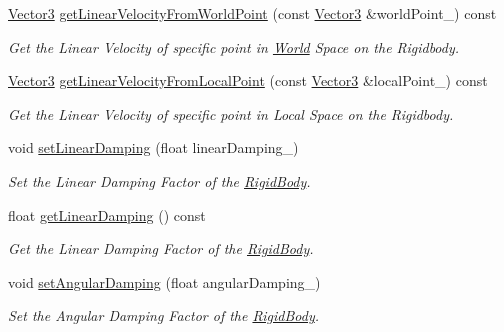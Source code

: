 \begin{DoxyCompactItemize}
\hyperlink{class_i_dream_sky_1_1_vector3}{Vector3} \hyperlink{class_i_dream_sky_1_1_physics3_1_1_rigid_body_a671f0361b94d8727d152e0dc17eaa7e6}{get\+Linear\+Velocity\+From\+World\+Point} (const \hyperlink{class_i_dream_sky_1_1_vector3}{Vector3} \&world\+Point\+\_\+) const 
\begin{DoxyCompactList}\small\item\em Get the Linear Velocity of specific point in \hyperlink{class_i_dream_sky_1_1_physics3_1_1_world}{World} Space on the Rigidbody. \end{DoxyCompactList}\item 
\hyperlink{class_i_dream_sky_1_1_vector3}{Vector3} \hyperlink{class_i_dream_sky_1_1_physics3_1_1_rigid_body_a5aca0169fb6e1fb70158cec477f53e73}{get\+Linear\+Velocity\+From\+Local\+Point} (const \hyperlink{class_i_dream_sky_1_1_vector3}{Vector3} \&local\+Point\+\_\+) const 
\begin{DoxyCompactList}\small\item\em Get the Linear Velocity of specific point in Local Space on the Rigidbody. \end{DoxyCompactList}\item 
void \hyperlink{class_i_dream_sky_1_1_physics3_1_1_rigid_body_a5fd41697e67b5dea2b5ca0bcdcda9c22}{set\+Linear\+Damping} (float linear\+Damping\+\_\+)
\begin{DoxyCompactList}\small\item\em Set the Linear Damping Factor of the \hyperlink{class_i_dream_sky_1_1_physics3_1_1_rigid_body}{Rigid\+Body}. \end{DoxyCompactList}\item 
float \hyperlink{class_i_dream_sky_1_1_physics3_1_1_rigid_body_a70ca7bcda490e12f2a9f3215a0d31832}{get\+Linear\+Damping} () const 
\begin{DoxyCompactList}\small\item\em Get the Linear Damping Factor of the \hyperlink{class_i_dream_sky_1_1_physics3_1_1_rigid_body}{Rigid\+Body}. \end{DoxyCompactList}\item 
void \hyperlink{class_i_dream_sky_1_1_physics3_1_1_rigid_body_adb8001be31fa3920c73c1bae548d469d}{set\+Angular\+Damping} (float angular\+Damping\+\_\+)
\begin{DoxyCompactList}\small\item\em Set the Angular Damping Factor of the \hyperlink{class_i_dream_sky_1_1_physics3_1_1_rigid_body}{Rigid\+Body}. \end{DoxyCompactList}\item 

\end{DoxyCompactItemize}
